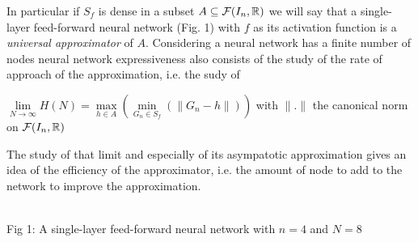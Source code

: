 \documentclass[12pt, a4paper]{article}
\def\layersep{2.5cm}
\begin{document}
In particular if $S_f$ is dense in a subset $A \subseteq \mathcal{F}(I_n, \mathbb{R})$ we will say that a single-layer feed-forward neural network (Fig. 1) with $f$ as its activation function is a \textit{universal approximator} of $A$. Considering a neural network has a finite number of nodes neural network expressiveness also consists of the study of the rate of approach of the approximation, i.e. the sudy of \\

\begin{center}
  $\lim\limits_{N \to \infty} H(N) = \max\limits_{h\in A} (\min\limits_{G_n \in S_f} (\parallel G_n - h \parallel))$ with $\parallel . \parallel$ the canonical norm on $\mathcal{F}(I_n, \mathbb{R})$
\end{center}

The study of that limit and especially of its asympatotic approximation gives an idea of the efficiency of the approximator, i.e. the amount of node to add to the network to improve the approximation.\\

\begin{center}
  \\
Fig 1: A single-layer feed-forward neural network with $n=4$ and $N=8$
\end{center}
\end{document}

